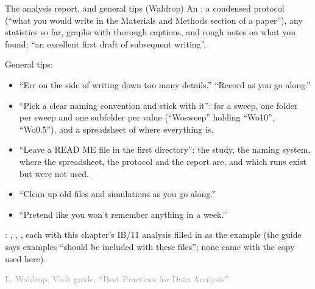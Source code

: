 \documentclass[aspectratio=169,11pt]{beamer}
\newcommand{\sourcecredit}[1]{\vfill\begin{flushright}\tiny\textcolor{DarkGray}{#1}\end{flushright}}
\begin{document}
\begin{frame}{The analysis report, and general tips (Waldrop)}
\label{fr:tips}
\footnotesize
An : a condensed protocol (``what you would write in the Materials and Methods section of a paper''), any statistics so far, graphs with thorough captions, and rough notes on what you found; ``an excellent first draft of subsequent writing''.

\vspace{1mm}
General tips:
\begin{itemize}
  \item ``Err on the side of writing down too many details.'' ``Record as you go along.''
  \item ``Pick a clear naming convention and stick with it'': for a sweep, one folder per sweep and one subfolder per value (``Wosweep'' holding ``Wo10'', ``Wo0.5''), and a spreadsheet of where everything is.
  \item ``Leave a READ ME file in the first directory'': the study, the naming system, where the spreadsheet, the protocol and the report are, and which runs exist but were not used.
  \item ``Clean up old files and simulations as you go along.''
  \item ``Pretend like you won't remember anything in a week.''
\end{itemize}
 : , , , each with this chapter's IB/11 analysis filled in as the example (the guide says examples ``should be included with these files''; none came with the copy used here).
\sourcecredit{L. Waldrop, VisIt guide, ``Best Practices for Data Analysis''.}
\end{frame}
\end{document}
